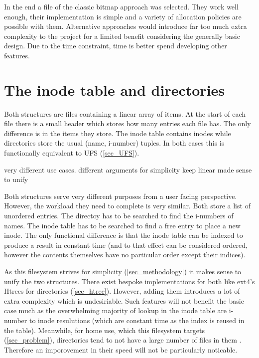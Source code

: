         In the end a file of the classic bitmap approach was selected. They
        work well enough, their implementation is simple and a variety of
        allocation policies are possible with them. Alternative approaches
        would introduce far too much extra complexity to the project for a
        limited benefit considering the generally basic design. Due to the time
        constraint, time is better spend developing other features.

    \section{The inode table and directories}

        Both structures are files containing a linear array of items. At the
        start of each file there is a small header which stores how many
        entries each file has. The only difference is in the items they store.
        The inode table contains inodes while directories store the usual
        (name, i-number) tuples. In both cases this is functionally equivalent
        to UFS (\ref{sec_UFS}).

        very different use cases.
        different arguments
        for simplicity keep linear
        made sense to unify

        Both structures serve very different purposes from a user facing
        perspective. However, the workload they need to complete is very
        similar. Both store a list of unordered entries. The directoy has to be
        searched to find the i-numbers of names. The inode table has to be
        searched to find a free entry to place a new inode. The only functional
        difference is that the inode table can be indexed to produce a result
        in constant time (and to that effect can be considered ordered, however
        the contents themselves have no particular order except their indices).

        As this filesystem strives for simplicity (\ref{sec_methodology}) it
        makes sense to unify the two structures. There exist bespoke
        implementations for both like ext4's Htrees for directories
        (\ref{sec_htree}). However, adding them introduces a lot of extra
        complexity which is undesiriable. Such features will not benefit the
        basic case much as the overwhelming majority of lookup in the inode
        table are i-number to inode resulutions (which are constant time as the
        index is reused in the table). Meanwhile, for home use, which this
        filesystem targets (\ref{sec_problem}), directories tend to not have a
        large number of files in them \cite{contents_strudy}. Therefore an
        imporovement in their speed will not be particularly noticable.

